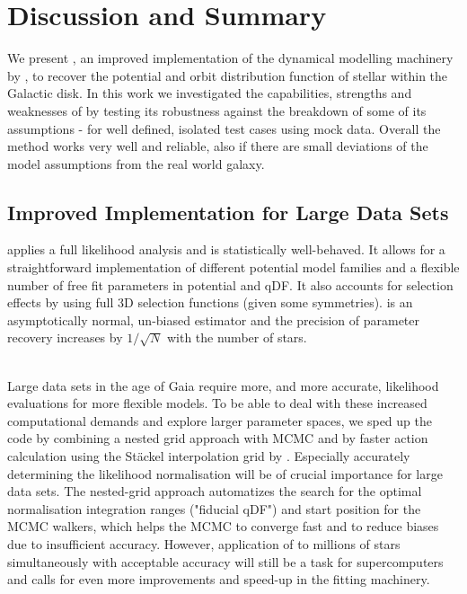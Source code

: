 \section{Discussion and Summary} \label{sec:discussionsummary}

We present \RM, an improved implementation of the dynamical modelling machinery by \citet{bov13}, to recover the potential and orbit distribution function of stellar \MAPs within the Galactic disk. In this work we investigated the capabilities, strengths and weaknesses of \RM by testing its robustness against the breakdown of some of its assumptions - for well defined, isolated test cases using mock data. Overall the method works very well and reliable, also if there are small deviations of the model assumptions from the real world galaxy.

\subsection{Improved Implementation for Large Data Sets}

\RM applies a full likelihood analysis and is statistically well-behaved. It allows for a straightforward implementation of different potential model families and a flexible number of free fit parameters in potential and qDF. It also accounts for selection effects by using full 3D selection functions (given some symmetries). \RM is an asymptotically normal, un-biased estimator and the precision of parameter recovery increases by $1/\sqrt{N}$ with the number of stars.

\\Large data sets in the age of Gaia require more, and more accurate, likelihood evaluations for more flexible models. To be able to deal with these increased computational demands and explore larger parameter spaces, we sped up the code by combining a nested grid approach with MCMC and by faster action calculation using the St\"{a}ckel \citep{bin12} interpolation grid by \citet{bov15}. Especially accurately determining the likelihood normalisation will be of crucial importance for large data sets. The nested-grid approach automatizes the search for the optimal normalisation integration ranges ("fiducial qDF") and start position for the MCMC walkers, which helps the MCMC to converge fast and to reduce biases due to insufficient accuracy. However, application of \RM to millions of stars simultaneously with acceptable accuracy will still be a task for supercomputers and calls for even more improvements and speed-up in the fitting machinery.

